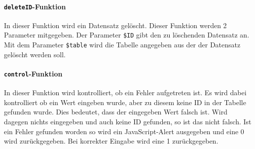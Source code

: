 \paragraph{\texttt{deleteID}-Funktion\\}
In dieser Funktion wird ein Datensatz gelöscht. Dieser Funktion werden 2 Parameter mitgegeben. Der Parameter \texttt{\$ID} gibt den zu löschenden Datensatz an. Mit dem Parameter \texttt{\$table} wird die Tabelle angegeben aus der der Datensatz gelöscht werden soll.



\paragraph{\texttt{control}-Funktion}
\label{sec:content_imple_control}
$ ~~ $\\
In dieser Funktion wird kontrolliert, ob ein Fehler aufgetreten ist. Es wird dabei kontrolliert ob ein Wert eingeben wurde, aber zu diesem keine ID in der Tabelle gefunden wurde. Dies bedeutet, dass der eingegeben Wert falsch ist. Wird dagegen nichts eingegeben und auch keine ID gefunden, so ist das nicht falsch. Ist ein Fehler gefunden worden so wird ein JavaScript-Alert ausgegeben und eine 0 wird zurückgegeben. Bei korrekter Eingabe wird eine 1 zurückgegeben.


%
%

%
%
%
% 
%
